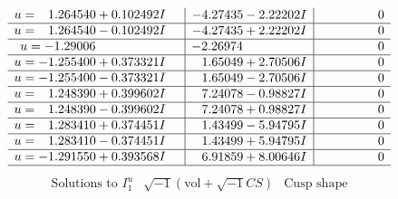 \documentclass[1p]{elsarticle_modified}
\theoremstyle{definition}
\newcommand{\I}{\sqrt{-1}}
\begin{document}
$$\begin{array}{c|c|c}
\begin{aligned}
u &= \phantom{-}1.264540 + 0.102492 I\end{aligned}
 & -4.27435 - 2.22202 I & \phantom{-0.000000 } 0 \\ \hline\begin{aligned}
u &= \phantom{-}1.264540 - 0.102492 I\end{aligned}
 & -4.27435 + 2.22202 I & \phantom{-0.000000 } 0 \\ \hline\begin{aligned}
u &= -1.29006\phantom{ +0.000000I}\end{aligned}
 & -2.26974\phantom{ +0.000000I} & \phantom{-0.000000 } 0 \\ \hline\begin{aligned}
u &= -1.255400 + 0.373321 I\end{aligned}
 & \phantom{-}1.65049 + 2.70506 I & \phantom{-0.000000 } 0 \\ \hline\begin{aligned}
u &= -1.255400 - 0.373321 I\end{aligned}
 & \phantom{-}1.65049 - 2.70506 I & \phantom{-0.000000 } 0 \\ \hline\begin{aligned}
u &= \phantom{-}1.248390 + 0.399602 I\end{aligned}
 & \phantom{-}7.24078 - 0.98827 I & \phantom{-0.000000 } 0 \\ \hline\begin{aligned}
u &= \phantom{-}1.248390 - 0.399602 I\end{aligned}
 & \phantom{-}7.24078 + 0.98827 I & \phantom{-0.000000 } 0 \\ \hline\begin{aligned}
u &= \phantom{-}1.283410 + 0.374451 I\end{aligned}
 & \phantom{-}1.43499 - 5.94795 I & \phantom{-0.000000 } 0 \\ \hline\begin{aligned}
u &= \phantom{-}1.283410 - 0.374451 I\end{aligned}
 & \phantom{-}1.43499 + 5.94795 I & \phantom{-0.000000 } 0 \\ \hline\begin{aligned}
u &= -1.291550 + 0.393568 I\end{aligned}
 & \phantom{-}6.91859 + 8.00646 I & \phantom{-0.000000 } 0\\
 \hline 
 \end{array}$$\newpage$$\begin{array}{c|c|c}  
\text{Solutions to }I^u_{1}& \I (\text{vol} + \sqrt{-1}CS) & \text{Cusp shape}\\

\end{array}$$
\end{document}
